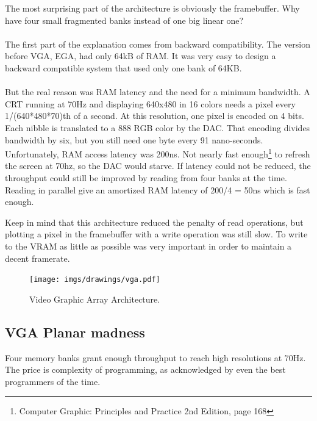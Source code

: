 \documentclass[book.tex]{subfiles}
\begin{document}
The most surprising part of the architecture is obviously the framebuffer. Why have four small fragmented banks instead of one big linear one?\\
\\
The first part of the explanation comes from backward compatibility. The version before VGA, EGA, had only 64kB of RAM. It was very easy to design a backward compatible system that used only one bank of 64KB.\\
\\
But the real reason was RAM latency and the need for a minimum bandwidth. A CRT running at 70Hz and displaying 640x480 in 16 colors needs a pixel every 1/(640*480*70)th of a second. At this resolution, one pixel is encoded on 4 bits. Each nibble is translated to a 888 RGB color by the DAC. That encoding divides bandwidth by six, but you still need one byte every 91 nano-seconds. Unfortunately, RAM access latency was 200ns. Not nearly fast enough\footnote{Computer Graphic: Principles and Practice 2nd Edition, page 168} to refresh the screen at 70hz, so the DAC would starve. If latency could not be reduced, the throughput could still be improved by reading from four banks at the time. Reading in parallel give an amortized RAM latency of 200/4 = 50ns which is fast enough.\\
\par
Keep in mind that this architecture reduced the penalty of read operations, but plotting a pixel in the framebuffer with a write operation was still slow. To write to the VRAM as little as possible was very important in order to maintain a decent framerate. 


\begin{figure}[H]
\centering
\texttt{[image: imgs/drawings/vga.pdf]}
\caption{Video Graphic Array Architecture.}
\label{fig:vga_arch}
\end{figure}




\subsection{VGA Planar madness}

Four memory banks grant enough throughput to reach high resolutions at 70Hz. The price is complexity of programming, as acknowledged by even the best programmers of the time.\\
\end{document}

